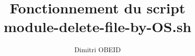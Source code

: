 \documentclass[a4paper,10pt]{article}
\title{\color{sec1}Fonctionnement du script\\ \textbf{\color{sec2}module-delete-file-by-OS.sh}}\color{text}
\author{Dimitri OBEID}
\begin{document}
    \maketitle
    \newpage

    \hypertarget{contents}{}
    \tableofcontents
    \newpage

    \begin{abstract}

    \end{abstract}

    \section{}




\end{document}
